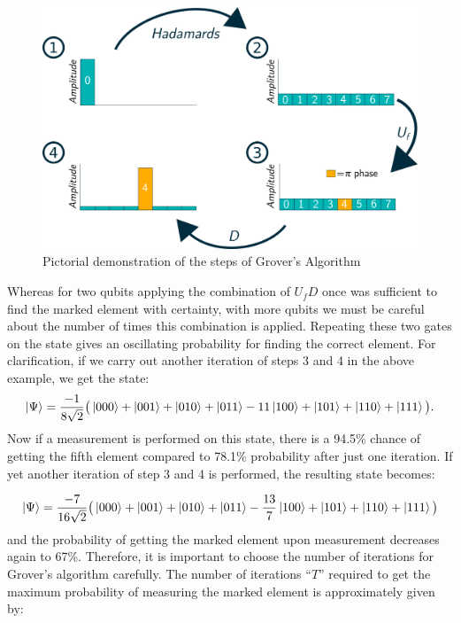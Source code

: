 \begin{figure}
    \centering
    \includegraphics[width=0.9\linewidth]{figures/Grovers.png}
    \caption{Pictorial demonstration of the steps of Grover's Algorithm}
    \label{fig:Grovers}
\end{figure}



Whereas for two qubits applying the combination of $U_fD$ once was sufficient to find the marked element with certainty, with more qubits we must be careful about the number of times this combination is applied. Repeating these two gates on the state gives an oscillating probability for finding the correct element. For clarification, if we carry out another iteration of steps 3 and 4 in the above example, we get the state:
\begin{align}
\left\vert{\Psi}\right\rangle=\dfrac{-1}{8\sqrt{2}}\big(\left\vert{000}\right\rangle+\left\vert{001}\right\rangle+\left\vert{010}\right\rangle+\left\vert{011}\right\rangle-11\left\vert{100}\right\rangle+\left\vert{101}\right\rangle+\left\vert{110}\right\rangle+\left\vert{111}\right\rangle\big).
\end{align}
 Now if a measurement is performed on this state, there is a 94.5\% chance of getting the fifth element compared to 78.1\% probability after just one iteration. If yet another iteration of step 3 and 4 is performed, the resulting state becomes:

\begin{align}
\left\vert{\Psi}\right\rangle=\dfrac{-7}{16\sqrt{2}}\big(\left\vert{000}\right\rangle+\left\vert{001}\right\rangle+\left\vert{010}\right\rangle+\left\vert{011}\right\rangle-\frac{13}{7}\left\vert{100}\right\rangle+\left\vert{101}\right\rangle+\left\vert{110}\right\rangle+\left\vert{111}\right\rangle\big)    
\end{align}
and the probability of getting the marked element upon measurement decreases again to 67\%. Therefore, it is important to choose the number of iterations for Grover's algorithm carefully. The number of iterations ``$T$'' required to get the maximum probability of measuring the marked element is approximately given by:

